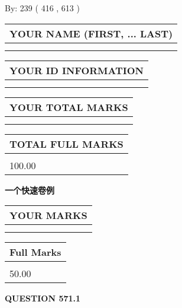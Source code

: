 \documentclass{ctexart}
\begin{document}
   
\hspace{1.0in} By: 
 239 ( 416 ,  613 )
   
   
   
   
\newpage 
\setcounter{page}{ 
   571001 } 
   
   
   
   
\noindent\begin{tabular}{|l|}
\hline
YOUR NAME (FIRST, ... LAST)  \\
\hline
 \\ 
 \\ 
\hline
\end{tabular}
\hspace{0.05in} \begin{tabular}{|l|}
\hline
 YOUR   ID   INFORMATION  \\
\hline
 \\ 
 \\ 
\hline
\end{tabular}
   
   
\vspace{0.2in}\noindent\begin{tabular}{|l|}
\hline
YOUR TOTAL MARKS  \\
\hline
 \\ 
 \\ 
\hline
\end{tabular}
\hspace{0.05in} \begin{tabular}{|l|}
\hline
TOTAL FULL MARKS  \\
\hline
 \\ 
100.00 \\
\hline
\end{tabular}
   
   
 \vspace{0.2in}
{\LARGE {\textbf{ 一个快速卷例}}}
   
   
  
\vspace{0.2in}
  
\noindent\begin{tabular}{|l|}
\hline
 YOUR MARKS  \\
\hline
 \\ 
 \\ 
\hline
\end{tabular}
\hspace{0.05in} \begin{tabular}{|l|}
\hline
 Full Marks  \\
\hline
 \\ 
50.00 \\
\hline
\end{tabular}
{\textbf{\Large{QUESTION
571.1 
}}}
  
\end{document}
